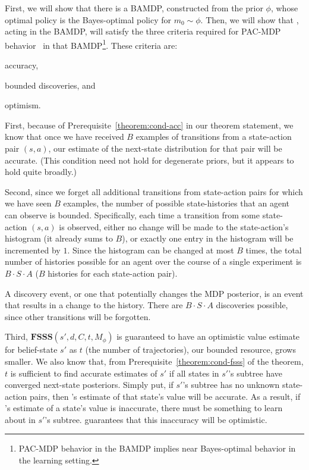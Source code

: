 \begin{proofsketch}

First, we will show that there is a BAMDP, constructed from the prior $\phi$, whose optimal policy is the Bayes-optimal policy for $m_0\sim \phi$. Then, we will show that , acting in the BAMDP, will satisfy the three criteria required for PAC-MDP behavior~\cite{kakade03,lihong09pacmdp} in that BAMDP\footnote{PAC-MDP behavior in the BAMDP implies near Bayes-optimal behavior in the learning setting.}.
These criteria are: \begin{inparaenum} \item accuracy, \item bounded discoveries, and \item optimism. \end{inparaenum}

First, because of Prerequisite~\ref{theorem:cond-acc} in our theorem statement, we know that once we have received $B$ examples of transitions from a state-action pair $(s,a)$, our estimate of the next-state distribution for that pair will be accurate.  (This condition need not hold for degenerate priors, but it appears to hold quite broadly.)

Second, since we forget all additional transitions from state-action pairs for which we have seen $B$ examples, the number of possible state-histories that an agent can observe is bounded.  Specifically, each time a transition from some state-action $(s,a)$ is observed, either no change will be made to the state-action's histogram (it already sums to $B$), or exactly one entry in the histogram will be incremented by $1$.  Since the histogram can be changed at most $B$ times, the total number of histories possible for an agent over the course of a single experiment is $B \cdot S \cdot A$ ($B$ histories for each state-action pair).

A discovery event, or one that potentially changes the MDP posterior, is an event that results in a change to the history. There are $B \cdot S \cdot A$ discoveries possible, since other transitions will be forgotten.

Third, $\mathbf{FSSS}(s',d,C,t,M_\phi)$ is guaranteed to have an optimistic value estimate for belief-state $s'$ as $t$ (the number of trajectories), our bounded resource, grows smaller. We also know that, from Prerequisite~\ref{theorem:cond-fsss} of the theorem, $t$ is sufficient to find accurate estimates of $s'$ if all states in $s'$'s subtree have converged next-state posteriors. Simply put, if $s'$'s subtree has no unknown state-action pairs, then 's estimate of that state's value will be accurate.  As a result, if 's estimate of a state's value is inaccurate, there must be something to learn about in $s'$'s subtree.  guarantees that this inaccuracy will be optimistic.


\end{proofsketch}
